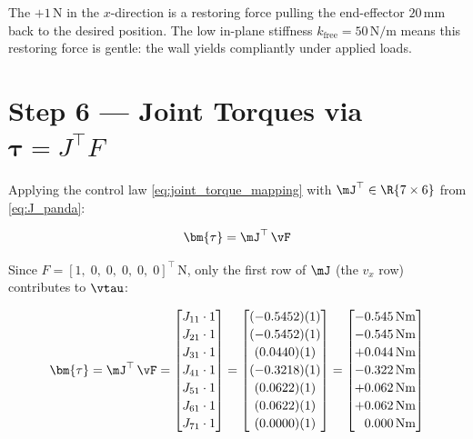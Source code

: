 The \(+1\,\mathrm{N}\) in the \(x\)-direction is a restoring force pulling the
end-effector $20\,\mathrm{mm}$ back to the desired position.
The low in-plane stiffness $k_{\mathrm{free}}=50\,\mathrm{N/m}$ means this
restoring force is gentle: the wall yields compliantly under applied loads.

\section{Step 6 --- Joint Torques via \texorpdfstring{$\bm{\tau} = J^\top F$}{tau = J\^{}T F}}
\label{app:panda_torques}

Applying the control law \cref{eq:joint_torque_mapping} with $\mJ^\top \in \R{7\times6}$
from \cref{eq:J_panda}:

\begin{equation}
\label{eq:panda_torque_calc}
\bm{\tau} = \mJ^\top\,\vF
\end{equation}

Since $F = [1,\;0,\;0,\;0,\;0,\;0]^\top\,\mathrm{N}$,
only the first row of $\mJ$ (the $v_x$ row) contributes to $\vtau$:

\begin{equation}
\label{eq:panda_tau}
\bm{\tau} = \mJ^\top\,\vF =
\begin{bmatrix}
J_{11}\cdot 1 \\[2pt]
J_{21}\cdot 1 \\[2pt]
J_{31}\cdot 1 \\[2pt]
J_{41}\cdot 1 \\[2pt]
J_{51}\cdot 1 \\[2pt]
J_{61}\cdot 1 \\[2pt]
J_{71}\cdot 1
\end{bmatrix}
=
\begin{bmatrix}
(-0.5452)(1) \\[2pt]
(-0.5452)(1) \\[2pt]
( 0.0440)(1) \\[2pt]
(-0.3218)(1) \\[2pt]
( 0.0622)(1) \\[2pt]
( 0.0622)(1) \\[2pt]
( 0.0000)(1)
\end{bmatrix}
=
\begin{bmatrix}
-0.545\,\mathrm{Nm} \\[2pt]
-0.545\,\mathrm{Nm} \\[2pt]
+0.044\,\mathrm{Nm} \\[2pt]
-0.322\,\mathrm{Nm} \\[2pt]
+0.062\,\mathrm{Nm} \\[2pt]
+0.062\,\mathrm{Nm} \\[2pt]
\phantom{+}0.000\,\mathrm{Nm}
\end{bmatrix}
\end{equation}

